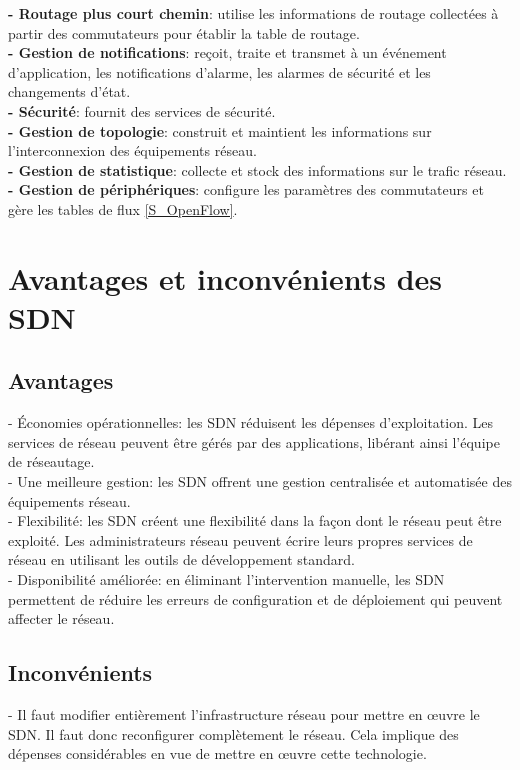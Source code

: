 \noindent\textbf{- Routage plus court chemin}: utilise les informations de routage collectées à partir des commutateurs pour établir la table de routage.\\
\textbf{- Gestion de notifications}: reçoit, traite et transmet à un événement d’application, les notifications d’alarme, les alarmes de sécurité et les changements d’état.\\
\textbf{- Sécurité}: fournit des services de sécurité.\\
\textbf{- Gestion de topologie}: construit et maintient les informations sur l'interconnexion des équipements réseau.\\
\textbf{- Gestion de statistique}: collecte et stock des informations sur le trafic réseau.\\
\textbf{- Gestion de périphériques}: configure les paramètres des commutateurs et gère les tables de flux \autoref{S_OpenFlow}.
 

\section{Avantages et inconvénients des SDN}
\subsection{Avantages}
\noindent - Économies opérationnelles: les SDN réduisent les dépenses d’exploitation. Les services de réseau peuvent être gérés par des applications, libérant ainsi l’équipe de réseautage.\\

\noindent - Une meilleure gestion: les SDN offrent une gestion centralisée et automatisée des équipements réseau.\\

\noindent - Flexibilité: les SDN créent une flexibilité dans la façon dont le réseau peut être exploité. Les administrateurs réseau peuvent écrire leurs propres services de réseau en utilisant les outils de développement standard.\\

\noindent - Disponibilité améliorée: en éliminant l’intervention manuelle, les SDN permettent de réduire les erreurs de configuration et de déploiement qui peuvent affecter le réseau. 

\subsection{Inconvénients}
\noindent - Il faut modifier entièrement l’infrastructure réseau  pour mettre en œuvre le SDN. Il faut donc reconfigurer complètement le réseau. Cela implique des dépenses considérables en vue de mettre en œuvre cette technologie.\\

